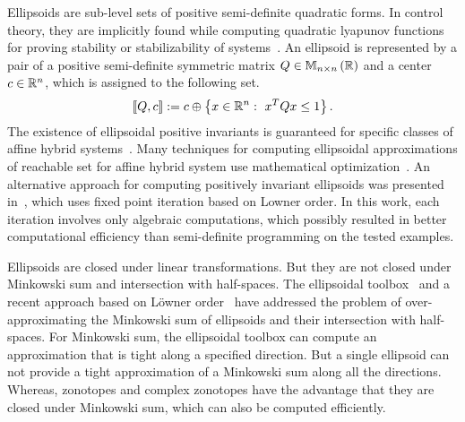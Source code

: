 Ellipsoids are sub-level sets of positive semi-definite quadratic
forms.  In control theory, they are implicitly found while computing
quadratic lyapunov functions for proving stability or stabilizability of
systems~\cite{blanchini2008set}.  An ellipsoid is represented by a pair of a
positive semi-definite symmetric matrix $Q\in\mathbb{M}_{n\times n}\left(\mathbb{R}\right)$ and a center
$c\in\mathbb{R}^n$, which is assigned to the following set.
%
\[
\left\llbracket Q,c\right\rrbracket:=c\oplus\left\{x\in\mathbb{R}^n:~{x}^TQx\leq 1\right\}.
\]
%
The existence of ellipsoidal positive invariants is guaranteed for
specific classes of affine hybrid systems~\cite{shorten2003result}.  Many techniques
for computing ellipsoidal approximations of reachable set for affine
hybrid system use mathematical
optimization~\cite{blanchini2008set,kurzhanskiy2006ellipsoidal,DBLP:conf/hybrid/RouxJGF12}.  An
alternative approach for computing positively invariant ellipsoids was
presented in~\cite{DBLP:journals/tecs/AllamigeonGSGP16}, which uses
fixed point iteration based on Lowner order.  In this work, each
iteration involves only algebraic computations, which possibly
resulted in better computational efficiency than semi-definite
programming on the tested examples.

Ellipsoids are closed under linear transformations.  But they are not
closed under Minkowski sum and intersection with half-spaces.  The
ellipsoidal toolbox~\cite{kurzhanskiy2006ellipsoidal} and a recent
approach based on L\"owner order~\cite{allamigeon2017fast} have addressed
the problem of over-approximating the Minkowski sum of ellipsoids and
their intersection with half-spaces.  For Minkowski sum, the
ellipsoidal toolbox can compute an approximation that is tight along a
specified direction.  But a single ellipsoid can not provide a tight
approximation of a Minkowski sum along all the directions.  Whereas,
zonotopes and complex zonotopes have the advantage that they are
closed under Minkowski sum, which can also be computed efficiently.

